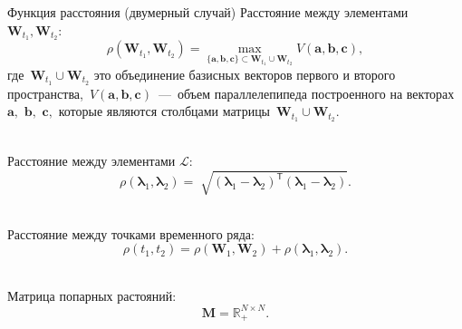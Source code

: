 \documentclass[9pt,pdf,hyperref={unicode}]{beamer}
\begin{document}
\begin{frame}[shrink=5]{Функция расстояния (двумерный случай)}
\justifying
Расстояние между элементами~$\mathbf{W}_{t_1},\mathbf{W}_{t_2}$:\\
$$
\rho\left(\textbf{W}_{t_1}, \textbf{W}_{t_2}\right) = \max_{\{\textbf{a},\textbf{b},\textbf{c}\} \subset \textbf{W}_{t_1}\cup \textbf{W}_{t_2} } V\left(\textbf{a},\textbf{b},\textbf{c}\right), 
$$
где~$\textbf{W}_{t_1}\cup\textbf{W}_{t_2}$ это объединение базисных векторов первого и второго пространства,~$V\left(\textbf{a},\textbf{b},\textbf{c}\right)$~---~объем параллелепипеда построенного на векторах~$\textbf{a},$ $\textbf{b},$ $\textbf{c},$ которые являются столбцами матрицы~$\textbf{W}_{t_1}\cup\textbf{W}_{t_2}$.

~\\
Расстояние между элементами $\mathcal{L}$:\\
$$
\rho\left(\bm{\lambda}_1, \bm{\lambda}_2\right) = \sqrt[]{\left(\bm{\lambda}_1 - \bm{\lambda}_2\right)^{\mathsf{T}}\left(\bm{\lambda}_1 - \bm{\lambda}_2\right)}.
$$

~\\
Расстояние между точками временного ряда:\\
$$
\rho\left(t_1, t_2\right) = \rho\left(\textbf{W}_1, \textbf{W}_2\right) + \rho\left(\bm{\lambda}_1, \bm{\lambda}_2\right).
$$

~\\
Матрица попарных растояний:\\
$$\textbf{M} = \mathbb{R}_{+}^{N\times N}.$$

\end{frame}
\end{document}
